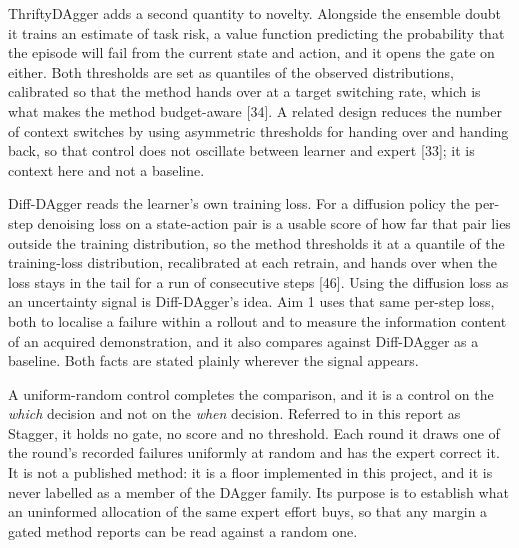 \documentclass[
  11pt,
]{article}
\begin{document}
ThriftyDAgger adds a second quantity to novelty. Alongside the ensemble
doubt it trains an estimate of task risk, a value function predicting
the probability that the episode will fail from the current state and
action, and it opens the gate on either. Both thresholds are set as
quantiles of the observed distributions, calibrated so that the method
hands over at a target switching rate, which is what makes the method
budget-aware {[}34{]}. A related design reduces the number of context
switches by using asymmetric thresholds for handing over and handing
back, so that control does not oscillate between learner and expert
{[}33{]}; it is context here and not a baseline.

Diff-DAgger reads the learner's own training loss. For a diffusion
policy the per-step denoising loss on a state-action pair is a usable
score of how far that pair lies outside the training distribution, so
the method thresholds it at a quantile of the training-loss
distribution, recalibrated at each retrain, and hands over when the loss
stays in the tail for a run of consecutive steps {[}46{]}. Using the
diffusion loss as an uncertainty signal is Diff-DAgger's idea. Aim 1
uses that same per-step loss, both to localise a failure within a
rollout and to measure the information content of an acquired
demonstration, and it also compares against Diff-DAgger as a baseline.
Both facts are stated plainly wherever the signal appears.

A uniform-random control completes the comparison, and it is a control
on the \emph{which} decision and not on the \emph{when} decision.
Referred to in this report as Stagger, it holds no gate, no score and no
threshold. Each round it draws one of the round's recorded failures
uniformly at random and has the expert correct it. It is not a published
method: it is a floor implemented in this project, and it is never
labelled as a member of the DAgger family. Its purpose is to establish
what an uninformed allocation of the same expert effort buys, so that
any margin a gated method reports can be read against a random one.
\end{document}
